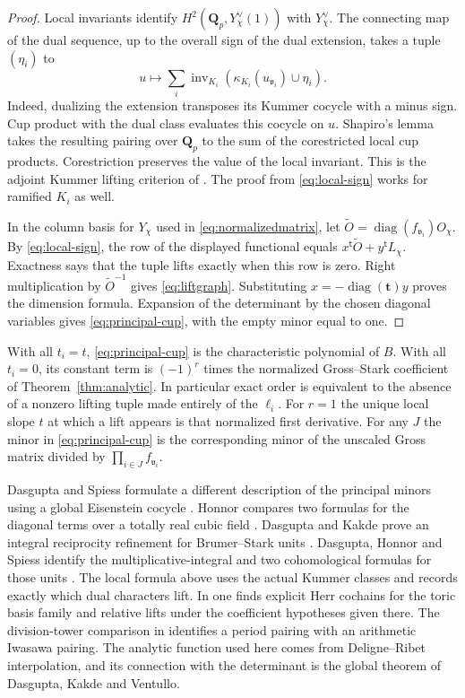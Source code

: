 \documentclass[11pt]{amsart}
\numberwithin{equation}{section}
\theoremstyle{definition}
\theoremstyle{remark}
\newcommand{\Q}{\mathbf Q}
\begin{document}
\begin{proof}
Local invariants identify $H^2(\Q_p,Y_\chi^\vee(1))$ with
$Y_\chi^\vee$. The connecting map of the dual sequence, up to the
overall sign of the dual extension, takes a tuple $(\eta_i)$ to
\[
 u\longmapsto \sum_i\operatorname{inv}_{K_i}
       (\kappa_{K_i}(u_{\mathfrak v_i})\cup\eta_i).
\]
Indeed, dualizing the extension transposes its Kummer cocycle with a
minus sign. Cup product with the dual class evaluates this cocycle on
$u$. Shapiro's lemma takes the resulting pairing over $\Q_p$ to the
sum of the corestricted local cup products. Corestriction preserves
the value of the local invariant.
This is the adjoint Kummer lifting criterion of
\cite[Prop.~7.5, eq.~(7.8)]{MohajerSemistable}. The proof from
\eqref{eq:local-sign} works for ramified $K_i$ as well.

In the column basis for $Y_\chi$ used in \eqref{eq:normalizedmatrix},
let $\widetilde O=\operatorname{diag}(f_{\mathfrak v_i})O_\chi$.
By \eqref{eq:local-sign}, the row of the displayed functional equals
$x^{\mathsf t}\widetilde O+y^{\mathsf t}L_\chi$.
Exactness says that the tuple lifts exactly when this row is zero.
Right multiplication by $\widetilde O^{-1}$ gives
\eqref{eq:liftgraph}. Substituting $x=-\operatorname{diag}(\mathbf t)y$
proves the dimension formula. Expansion of the determinant by the
chosen diagonal variables gives \eqref{eq:principal-cup}, with the
empty minor equal to one.
\end{proof}

With all $t_i=t$, \eqref{eq:principal-cup} is the characteristic
polynomial of $B$. With all $t_i=0$, its constant term is
$(-1)^r$ times the normalized Gross--Stark coefficient of
Theorem~\ref{thm:analytic}. In particular exact order is equivalent
to the absence of a nonzero lifting tuple made entirely of the
$\ell_i$. For $r=1$ the unique local slope $t$ at which a lift
appears is that normalized first derivative. For any $J$ the minor
in \eqref{eq:principal-cup} is the corresponding minor of the
unscaled Gross matrix divided by $\prod_{i\in J} f_{\mathfrak v_i}$.

Dasgupta and Spiess formulate a different description of the principal
minors using a global Eisenstein cocycle \cite{DS}. Honnor compares
two formulas for the diagonal terms over a totally real cubic
field \cite{Honnor}. Dasgupta and Kakde prove an integral
reciprocity refinement for Brumer--Stark units \cite{DKIntegral}.
Dasgupta, Honnor and Spiess identify the multiplicative-integral and
two cohomological formulas for those units \cite{DHS}. The local formula above uses the actual Kummer
classes and records exactly which dual characters lift. In
\cite[Thms.~13.3, 13.4]{MohajerSemistable} one finds explicit Herr
cochains for the toric basis family and relative lifts under the
coefficient hypotheses given there. The division-tower comparison in
\cite[Thms.~15.6, 15.7 and \S16.2]{MohajerSemistable} identifies a
period pairing with an arithmetic Iwasawa pairing. The analytic
function used here comes from Deligne--Ribet interpolation, and its
connection with the determinant is the global theorem of
Dasgupta, Kakde and Ventullo.
\end{document}
